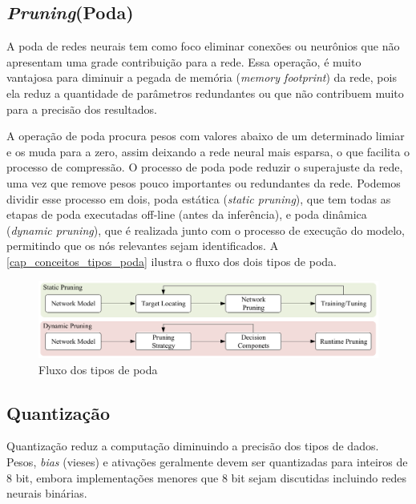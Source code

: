 \subsection{\textit{Pruning}(Poda)}\label{poda}

A poda de redes neurais tem como foco eliminar conexões ou neurônios que não apresentam uma grade contribuição para a
rede.
Essa operação, é muito vantajosa para diminuir a pegada de memória (\textit{memory footprint}) da rede, pois ela reduz
a quantidade de parâmetros redundantes ou que não contribuem muito para a precisão dos resultados.

A operação de poda procura pesos com valores abaixo de um determinado limiar e os muda para a zero, assim deixando
a rede neural mais esparsa, o que facilita o processo de compressão.
O processo de poda pode reduzir o superajuste da rede, uma vez que remove pesos pouco importantes ou redundantes
da rede.
Podemos dividir esse processo em dois, poda estática (\textit{static pruning}), que tem todas as etapas de poda
executadas off-line (antes da inferência), e poda dinâmica (\textit{dynamic pruning}), que é realizada junto com
o processo de execução do modelo, permitindo que os nós relevantes sejam identificados. A
\autoref{cap_conceitos_tipos_poda} ilustra o fluxo dos dois tipos de poda.

\begin{figure}[htb]
	\caption {\label{cap_conceitos_tipos_poda}Fluxo dos tipos de poda}
	\begin{center}
		\includegraphics[scale=0.5]{Imagens/categorias-poda}
	\end{center}
\end{figure}

\subsection{Quantização}\label{quantizacao}

Quantização reduz a computação diminuindo a precisão dos tipos de dados. Pesos, \textit{bias} (vieses) e ativações
geralmente devem ser quantizadas para inteiros de 8 bit, embora implementações menores que 8 bit sejam discutidas
incluindo redes neurais binárias. \cite{LIANG2021370}

